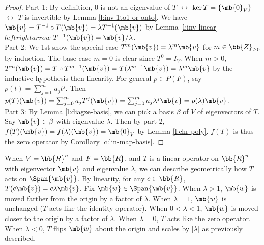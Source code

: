 \begin{proof}%
Part 1: By definition, 0 is not an eigenvalue of $T$ $\leftrightarrow$ $\ker T= \{ \mb{0}_V \}$ $\leftrightarrow$ $T$ is invertible by Lemma \ref{l:inv-1to1-or-onto}.
We have $\mb{v}=T^{-1}\circ T( \mb{v})= \lambda T^{-1}( \mb{v})$ by Lemma \ref{l:inv-linear} $leftrightarrow$ $T^{-1}( \mb{v})= \mb{v}/ \lambda$.\\
Part 2: We 1st show the special case $T^m( \mb{v})= \lambda^m \mb{v}$ for $m \in \bb{Z}_{\geq 0}$ by induction. The base case $m=0$ is clear since $T^0=I_V$.
When $m>0$, $T^m( \mb{v})=T \circ T^{m-1}( \mb{v})=T( \lambda^{m-1}\mb{v})= \lambda^m \mb{v}$ by the inductive hypothesis then linearity.
For general $p \in P(F)$, say $p(t)= \sum_{j=0}^ma_jt^j$. Then $p(T)( \mb{v})= \sum_{j=0}^ma_jT^j( \mb{v})= \sum_{j=0}^ma_j \lambda^j \mb{v}=p( \lambda) \mb{v}$.\\
Part 3: By Lemma \ref{l:diagze-basis}, we can pick a basis $\beta$ of $V$ of eigenvectors of $T$. Say $\mb{v}\in \beta$ with eigenvalue $\lambda$.
Then by part 2, $f(T)( \mb{v})=f( \lambda)( \mb{v})= \mb{0}_V$ by Lemma \ref{l:chr-poly}. $f(T)$ is thus the zero operator by Corollary \ref{c:lin-map-basis}.
\end{proof}
When $V= \bb{R}^n$ and $F= \bb{R}$, and $T$ is a linear operator on $\bb{R}^n$ with eigenvector $\mb{v}$ and eigenvalue $\lambda$, we can describe geometrically how $T$ acts on $\Span \{  \mb{v}\}$.
By linearity, for any $c \in \bb{R}$, $T(c \mb{v})=c \lambda \mb{v}$. Fix $\mb{w}\in \Span \{  \mb{v}\}$. When $\lambda>1$, $\mb{w}$ is moved farther from the origin by a factor of $\lambda$.
When $\lambda =1$, $\mb{w}$ is unchanged ($T$ acts like the identity operator). When $0< \lambda <1$, $\mb{w}$ is moved closer to the origin by a factor of $\lambda$.
When $\lambda =0$, $T$ acts like the zero operator. When $\lambda <0$, $T$ flips $\mb{w}$ about the origin and scales by $| \lambda |$ as previously described.

